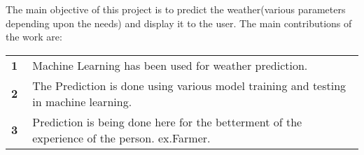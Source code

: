 \section*{}
The main objective of this project is to predict the  weather(various parameters depending upon the needs) and display it to the user. The main contributions of the work are: 
\vspace{5cm}
\begin{tabular}{p{0.06\linewidth}p{0.94\linewidth}}
\textbf{1} &Machine Learning  has been used for weather prediction.
\\
\textbf{2} &The Prediction is done using various model training and testing in machine   learning. 
 \\
\textbf{3} & Prediction is being done here for the betterment of the experience of the person. ex.Farmer.\\

\end{tabular}
